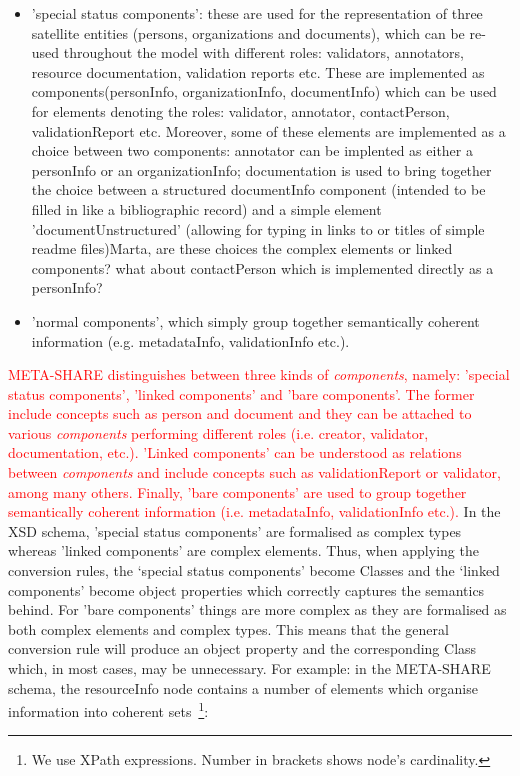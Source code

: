 \documentclass{llncs}
\begin{document}
{{\begin{itemize}
\item 'special status components': these are used for the representation of three satellite entities (persons, organizations and documents), which can be re-used throughout the model with different roles: validators, annotators, resource documentation, validation reports etc. These are implemented as components(personInfo, organizationInfo, documentInfo) which can be used for elements denoting the roles: validator, annotator, contactPerson, validationReport etc. Moreover, some of these elements are implemented as a choice between two components: annotator can be implented as either a personInfo or an organizationInfo; documentation is used to bring together the choice between a structured documentInfo component (intended to be filled in like a bibliographic record) and a simple element 'documentUnstructured' (allowing for typing in links to or titles of simple readme files){Marta, are these choices the complex elements or linked components? what about contactPerson which is implemented directly as a personInfo?}
\item 'normal components', which simply group together semantically coherent information (e.g. metadataInfo, validationInfo etc.).
\end{itemize}
}
\textcolor{red}{META-SHARE distinguishes between three kinds of \emph{components}, namely: 'special status components', 'linked components' and 'bare components'. The former include concepts such as person and document and they can be attached to various \emph{components} performing different roles (i.e. creator, validator, documentation, etc.). 'Linked components' can be understood as relations between \emph{components} and include concepts such as validationReport or validator, among many others. Finally, 'bare components' are used to group together semantically coherent information (i.e. metadataInfo, validationInfo etc.).}
In the XSD schema, 'special status components' are formalised as complex types whereas 'linked components' are complex elements. Thus, when applying the conversion rules, the ‘special status components’ become Classes and the ‘linked components’ become object properties which correctly captures the semantics behind. For 'bare components' things are more complex as they are formalised as both complex elements and complex types. This means that the general conversion rule will produce an object property and the corresponding Class which, in most cases, may be unnecessary. For example: in the META-SHARE schema, the resourceInfo node contains a number of elements which organise information into coherent sets~\footnote{We use XPath expressions. Number in brackets shows node’s cardinality.}:
}
\end{document}
